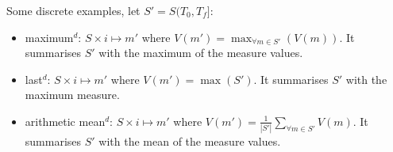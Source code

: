 Some discrete examples,
let $S'=S(T_0,T_f]$:
\begin{itemize}
\renewcommand{\labelitemi}{--}
\item maximum$^d$: $S \times i \mapsto m'$ where  $V(m') = \max_{\forall m
    \in S'}(V(m))$. It summarises $S'$ with the \linebreak[4] maximum of
  the measure values.
\item last$^d$: $S \times i \mapsto m'$ where $V(m') = \max(S')$. It
  summarises $S'$ with the maximum measure.
\item arithmetic mean$^d$: $S \times i \mapsto m'$ where $V(m') =
  \frac{1}{|S'|} \sum\limits_{\forall m\in S'} V(m)$. It
  summarises $S'$ with the mean of the measure values.
\end{itemize}





